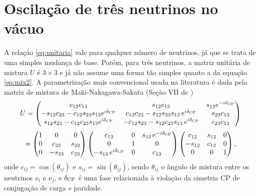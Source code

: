 \documentclass[12pt]{report}
\begin{document}
\section{Oscilação de três neutrinos no vácuo} \label{sec:3nu-vacuo}


A relação \ref{eq:unitaria} vale para qualquer número de neutrinos, já que se trata de uma simples mudança de base. Porém, para três neutrinos, a matriz unitária de mistura $U$ é $3 \times 3$ e já não assume uma forma tão simples quanto a da equação \ref{eq:mix2}. A parametrização mais convencional usada na literatura é dada pela matriz de mistura de Maki-Nakagawa-Sakata (Seção VII de \cite{gonzalez})
\begin{equation} \label{eq:mixmatrix}
U =
\begin{pmatrix}
c_{12} c_{13} & s_{12} c_{13} & s_{13} e^{-i\delta_{\text{CP}}} \\
-s_{12}c_{23} - c_{12}s_{23}s_{13}e^{i\delta_{\text{CP}}} & c_{12}c_{23} - s_{12}s_{23}s_{13} \, e^{i\delta_{\text{CP}}} & s_{23}c_{13} \\
s_{12}s_{23} - c_{12}c_{23}s_{13}e^{i\delta_{\text{CP}}} & -c_{12}s_{23} - s_{12}c_{23}s_{13} \, e^{i\delta_{\text{CP}}} & c_{23}c_{13} \\
\end{pmatrix}
\end{equation}
\begin{equation} \label{eq:3matrices}
=
\begin{pmatrix}
1 & 0 & 0 \\
0 & c_{23} & s_{23} \\
0 & -s_{23} & c_{23} \\
\end{pmatrix}
\begin{pmatrix}
c_{13} & 0 & s_{13} \, e^{-i\delta_{\text{CP}}} \\
0 & 1 & 0 \\
-s_{13} \, e^{i\delta_{\text{CP}}} & 0 & c_{13} \\
\end{pmatrix}
\begin{pmatrix}
c_{12} & s_{12} & 0 \\
-s_{12} & c_{12} & 0 \\
0 & 0 & 1 \\
\end{pmatrix},
\end{equation}
onde $c_{ij} = \cos(\theta_{ij})$ e $s_{ij} = \sin(\theta_{ij})$, sendo $\theta_{ij}$ o ângulo de mistura entre os neutrinos $\nu_i$ e $\nu_j$, e $\delta_{\text{CP}}$ é uma fase relacionada à violação da simetria CP de conjugação de carga e paridade.
\end{document}
